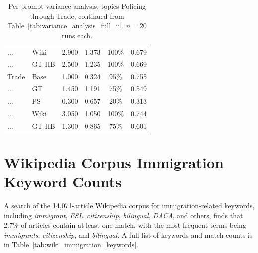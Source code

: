 \documentclass[11pt]{article}
\begin{document}
\begin{table}[t]
\begin{tabular}{llcccc}
    ...              & Wiki &2.900 & 1.373 & 100\% & 0.679 \\
    ...              & GT-HB & 2.500 & 1.235 & 100\% & 0.669 \\
    \addlinespace
    Trade            & Base & 1.000 & 0.324 & 95\% & 0.755 \\
    ...              & GT   & 1.450 & 1.191 & 75\% & 0.549 \\
    ...              & PS   & 0.300 & 0.657 & 20\% & 0.313 \\
    ...              & Wiki &3.050 & 1.050 & 100\% & 0.744 \\
    ...              & GT-HB & 1.300 & 0.865 & 75\% & 0.601 \\
  \bottomrule
  \end{tabular}
  \caption{Per-prompt variance analysis, topics Policing through Trade, continued from Table~\ref{tab:variance_analysis_full_ii}. $n=20$ runs each.}
  \label{tab:variance_analysis_full_iii}
\end{table}

\section{Wikipedia Corpus Immigration Keyword Counts}

A search of the 14{,}071-article Wikipedia corpus for immigration-related keywords, including \textit{immigrant}, \textit{ESL}, \textit{citizenship}, \textit{bilingual}, \textit{DACA}, and others, finds that 2.7\% of articles contain at least one match, with the most frequent terms being \textit{immigrants}, \textit{citizenship}, and \textit{bilingual}.
A full list of keywords and match counts is in Table~\ref{tab:wiki_immigration_keywords}.
\end{document}
